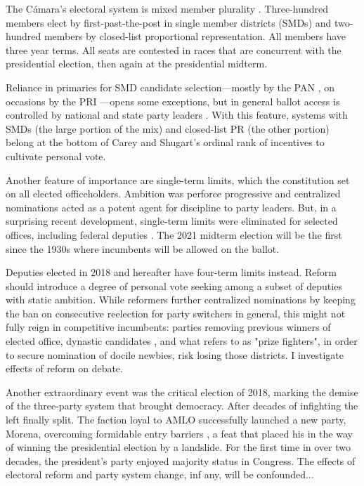 \documentclass[letter,12pt]{article}
\begin{document}
The Cámara's electoral system is mixed member plurality \citep{weldonMixedMemberSys2001}. Three-hundred members elect by first-past-the-post in single member districts (SMDs) and two-hundred members by closed-list proportional representation. All members have three year terms. All seats are contested in races that are concurrent with the presidential election, then again at the presidential midterm. 

Reliance in primaries for SMD candidate selection---mostly by the PAN \citep{ascencio.kerevel.cand-sel-beh.2021}, on occasions by the PRI \citep{poire.phd.2002}---opens some exceptions, but in general ballot access is controlled by national and state party leaders \citep{rosas.langston.2011,langston.2008}. With this feature, systems with SMDs (the large portion of the mix) and closed-list PR (the other portion) belong at the bottom of Carey and Shugart's \citeyearpar{carey.shugart.1995} ordinal rank of incentives to cultivate personal vote. 

Another feature of importance are single-term limits, which the constitution set on all elected officeholders. Ambition was perforce progressive \citep{schlesinger.1966} and centralized nominations acted as a potent agent for discipline to party leaders. But, in a surprising recent development, single-term limits were eliminated for selected offices, including federal deputies \citep{magarInstReel.2017}. The 2021 midterm election will be the first since the 1930s where incumbents will be allowed on the ballot.

Deputies elected in 2018 and hereafter have four-term limits instead. Reform should introduce a degree of personal vote seeking among a subset of deputies with static ambition. While reformers further centralized nominations by keeping the ban on consecutive reelection for party switchers in general, this might not fully reign in competitive incumbents: parties removing previous winners of elected office, dynastic candidates \citep{enriquez-dinastias2018itam}, and what \citep{zallerprizeFighters} refers to as "prize fighters", in order to secure nomination of docile newbies, risk losing those districts. I investigate effects of reform on debate. 

Another extraordinary event was the critical election of 2018, marking the demise of the three-party system that brought democracy. After decades of infighting the left finally split. The faction loyal to AMLO successfully launched a new party, Morena, overcoming formidable entry barriers \citep{magar.2007ref.2015}, a feat that placed his in the way of winning the presidential election by a landslide. For the first time in over two decades, the president's party enjoyed majority status in Congress. The effects of electoral reform and party system change, inf any, will be confounded...
\end{document}
